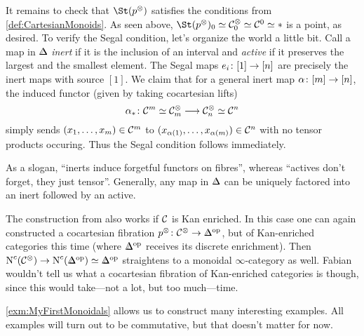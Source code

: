 \documentclass[a4paper, 10pt, oneside, DIV=9, chapterprefix=true, numbers=enddot,bibliography=totoc]{scrbook}
\begin{document}
\begin{exm}
\begin{alphanumerate}
		It remains to check that $\St (p^\otimes)$ satisfies the conditions from \cref{def:CartesianMonoids}. As seen above, $\St (p^\otimes)_0\simeq \Cc_0^\otimes \simeq \Cc^0\simeq *$ is a point, as desired. To verify the Segal condition, let's organize the world a little bit. Call a map in $\IDelta$ \emph{inert} if it is the inclusion of an interval and \emph{active} if it preserves the largest and the smallest element. The Segal maps $e_i\colon [1]\morphism {}[n]$ are precisely the inert maps with source $[1]$. We claim that for a general inert map $\alpha\colon [m]\morphism{[n]}$, the induced functor (given by taking cocartesian lifts) 
		\begin{equation*}
			\alpha_*\colon \Cc^m\simeq \Cc_m^\otimes \morphism \Cc_n^\otimes \simeq \Cc^n
		\end{equation*}
		simply sends $(x_1,\dotsc,x_m)\in \mathcal{C}^m$ to $(x_{\alpha(1)},\dotsc,x_{\alpha(m)})\in \mathcal{C}^n$ with no tensor products occuring. Thus the Segal condition follows immediately.
		
		As a slogan, \enquote{inerts induce forgetful functors on fibres}, whereas \enquote{actives don't forget, they just tensor}. Generally, any map in $\IDelta$ can be uniquely factored into an inert followed by an active.
		\item The construction from  also works if $\mathcal{C}$ is Kan enriched. In this case one can again constructed a cocartesian fibration $p^\otimes\colon \Cc^\otimes \morphism \IDelta^\op$, but of Kan-enriched categories this time (where $\IDelta^\op$ receives its discrete enrichment). Then $\N^c(\Cc^\otimes)\morphism \N^c(\IDelta^\op)\simeq \IDelta^\op$ straightens to a monoidal $\infty$-category as well. Fabian wouldn't tell us what a cocartesian fibration of Kan-enriched categories is though, since this would take---not a lot, but too much---time.
	\end{alphanumerate}
\end{exm}
\cref{exm:MyFirstMonoidals} allows us to construct many interesting examples. All examples will turn out to be commutative, but that doesn't matter for now.
\end{document}
